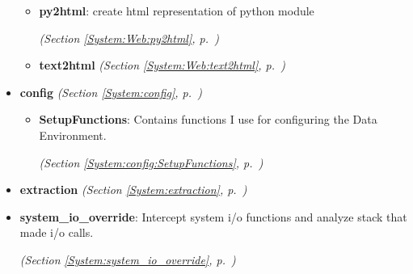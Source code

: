 \begin{itemize}
\begin{itemize}
    \item \textbf{py2html}: create html representation of python module



  \textit{(Section \ref{System:Web:py2html}, p.~\pageref{System:Web:py2html})}

    \item \textbf{text2html}
  \textit{(Section \ref{System:Web:text2html}, p.~\pageref{System:Web:text2html})}

  \end{itemize}
\item \textbf{config}
  \textit{(Section \ref{System:config}, p.~\pageref{System:config})}

  \begin{itemize}
\setlength{\parskip}{0ex}
    \item \textbf{SetupFunctions}: Contains functions I use for configuring the  Data Environment.



  \textit{(Section \ref{System:config:SetupFunctions}, p.~\pageref{System:config:SetupFunctions})}

  \end{itemize}
\item \textbf{extraction}
  \textit{(Section \ref{System:extraction}, p.~\pageref{System:extraction})}

\item \textbf{system\_io\_override}: 
Intercept system i/o functions and analyze stack that made i/o calls. 


  \textit{(Section \ref{System:system_io_override}, p.~\pageref{System:system_io_override})}

\end{itemize}

